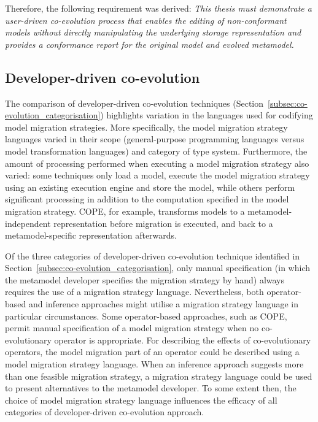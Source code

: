 Therefore, the following requirement was derived: \emph{This thesis must demonstrate a user-driven co-evolution process that enables the editing of non-co\-nf\-or\-ma\-nt models without directly manipulating the underlying storage representation and provides a conformance report for the original model and evolved metamodel.}


\subsection{Developer-driven co-evolution}
The comparison of developer-driven co-evolution techniques (Section~\ref{subsec:co-evolution_categorisation}) highlights variation in the languages used for codifying model migration strategies. More specifically, the model migration strategy languages varied in their scope (general-purpose programming languages versus model transformation languages) and category of type system. Furthermore, the amount of processing performed when executing a model migration strategy also varied: some techniques only load a model, execute the model migration strategy using an existing execution engine and store the model, while others perform significant processing in addition to the computation specified in the model migration strategy. COPE, for example, transforms models to a metamodel-independent representation before migration is executed, and back to a metamodel-specific representation afterwards.

Of the three categories of developer-driven co-evolution technique identified in Section~\ref{subsec:co-evolution_categorisation}, only manual specification (in which the metamodel developer specifies the migration strategy by hand) always requires the use of a migration strategy language. Nevertheless, both operator-based and inference approaches might utilise a migration strategy language in particular circumstances. Some operator-based approaches, such as COPE, permit manual specification of a model migration strategy when no co-evolutionary operator is appropriate. For describing the effects of co-evolutionary operators, the model migration part of an operator could be described using a model migration strategy language. When an inference approach suggests more than one feasible migration strategy, a migration strategy language could be used to present alternatives to the metamodel developer. To some extent then, the choice of model migration strategy language influences the efficacy of all categories of developer-driven co-evolution approach.  

